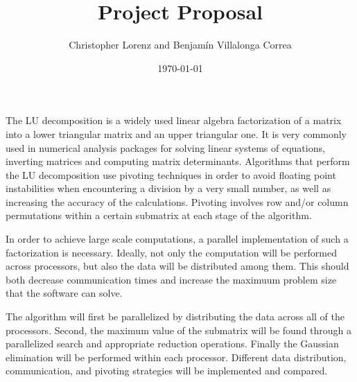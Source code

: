\documentclass[onecolumn]{article}
\date{\today}
\begin{document}
\author{Christopher Lorenz and Benjam\'in Villalonga Correa}
\title{Project Proposal}
\maketitle

The LU decomposition is a widely used linear algebra factorization of a matrix into a lower triangular matrix and an upper triangular one. It is very commonly used in numerical analysis packages for solving linear systems of equations, inverting matrices and computing matrix determinants. Algorithms that perform the LU decomposition use pivoting techniques in order to avoid floating point instabilities when encountering a division by a very small number, as well as increasing the accuracy of the calculations. Pivoting involves row and/or column permutations within a certain submatrix at each stage of the algorithm.

In order to achieve large scale computations, a parallel implementation of such a factorization is necessary. Ideally, not only the computation will be performed across processors, but also the data will be distributed among them. This should both decrease communication times and increase the maximuum problem size that the software can solve.

The algorithm will first be parallelized by distributing the data across all of the processors. Second, the maximum value of the submatrix will be found through a parallelized search and appropriate reduction operations. Finally the Gaussian elimination will be performed within each processor. Different data distribution, communication, and pivoting strategies will be implemented and compared.
\end{document}
